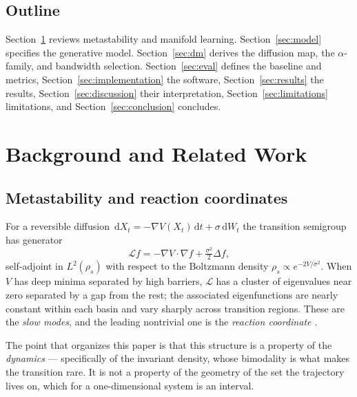\documentclass[11pt]{article}
\newcommand{\dd}{\,\mathrm{d}}
\begin{document}
\subsection{Outline}

Section~\ref{sec:background} reviews metastability and manifold learning.
Section~\ref{sec:model} specifies the generative model.
Section~\ref{sec:dm} derives the diffusion map, the $\alpha$-family, and
bandwidth selection. Section~\ref{sec:eval} defines the baseline and metrics,
Section~\ref{sec:implementation} the software, Section~\ref{sec:results} the
results, Section~\ref{sec:discussion} their interpretation,
Section~\ref{sec:limitations} limitations, and Section~\ref{sec:conclusion}
concludes.

\section{Background and Related Work}
\label{sec:background}

\subsection{Metastability and reaction coordinates}

For a reversible diffusion $\dd X_t = -\nabla V(X_t)\dd t + \sigma\dd W_t$ the
transition semigroup has generator
\begin{equation}
\mathcal{L} f = -\nabla V \cdot \nabla f + \tfrac{\sigma^2}{2}\Delta f ,
\label{eq:generator}
\end{equation}
self-adjoint in $L^2(\rho_s)$ with respect to the Boltzmann density
$\rho_s \propto e^{-2V/\sigma^2}$. When $V$ has deep minima separated by high
barriers, $\mathcal{L}$ has a cluster of eigenvalues near zero separated by a gap
from the rest; the associated eigenfunctions are nearly constant within each
basin and vary sharply across transition regions. These are the \emph{slow
modes}, and the leading nontrivial one is the \emph{reaction coordinate}
\citep{nadler2006diffusion}.

The point that organizes this paper is that this structure is a property of the
\emph{dynamics} --- specifically of the invariant density, whose bimodality is
what makes the transition rare. It is not a property of the geometry of the set
the trajectory lives on, which for a one-dimensional system is an interval.
\end{document}
